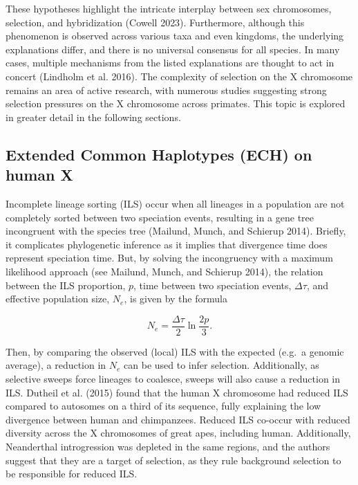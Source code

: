 \documentclass[
  11pt,
  a4paper,
]{scrbook}
\begin{document}
These hypotheses highlight the intricate interplay between sex
chromosomes, selection, and hybridization (Cowell 2023). Furthermore,
although this phenomenon is observed across various taxa and even
kingdoms, the underlying explanations differ, and there is no universal
consensus for all species. In many cases, multiple mechanisms from the
listed explanations are thought to act in concert (Lindholm et al.
2016). The complexity of selection on the X chromosome remains an area
of active research, with numerous studies suggesting strong selection
pressures on the X chromosome across primates. This topic is explored in
greater detail in the following sections.

\subsection{Extended Common Haplotypes (ECH) on human
X}\label{extended-common-haplotypes-ech-on-human-x}

Incomplete lineage sorting (ILS) occur when all lineages in a population
are not completely sorted between two speciation events, resulting in a
gene tree incongruent with the species tree (Mailund, Munch, and
Schierup 2014). Briefly, it complicates phylogenetic inference as it
implies that divergence time does represent speciation time. But, by
solving the incongruency with a maximum likelihood approach (see
Mailund, Munch, and Schierup 2014), the relation between the ILS
proportion, \(p\), time between two speciation events, \(\Delta\tau\),
and effective population size, \(N_e\), is given by the formula

\[
N_e = \frac{\Delta\tau}{2} \ln \frac{2p}{3}.
\]

Then, by comparing the observed (local) ILS with the expected (e.g.~a
genomic average), a reduction in \(N_e\) can be used to infer selection.
Additionally, as selective sweeps force lineages to coalesce, sweeps
will also cause a reduction in ILS. Dutheil et al. (2015) found that the
human X chromosome had reduced ILS compared to autosomes on a third of
its sequence, fully explaining the low divergence between human and
chimpanzees. Reduced ILS co-occur with reduced diversity across the X
chromosomes of great apes, including human. Additionally, Neanderthal
introgression was depleted in the same regions, and the authors suggest
that they are a target of selection, as they rule background selection
to be responsible for reduced ILS.
\end{document}
